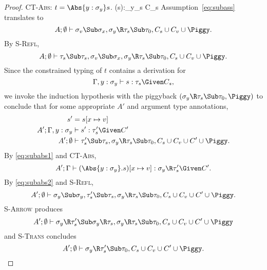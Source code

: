 \documentclass{amsart}
\theoremstyle{definition}
\begin{document}
\begin{proof}
\Case\textsc{CT-Abs}: $t=\Abs{y:\sigma_y}s$.
\def\yasump{\Gamma,y:\sigma_y\vdash s:\tau_s\Given C_s}
\infrule[CT-Abs]
{\yasump}
{\Gamma\vdash(s):\sigma_y\R\tau_s \Given C_s}
Assumption~\eqref{eq:subass} translates to
\[
A;\emptyset\vdash
\sigma_v\Sub\sigma_x,
\sigma_y\R\tau_s\Sub\tau_0,C_s\cup C_v\cup\Piggy.
\]
By \textsc{S-Refl},
\[
A;\emptyset\vdash
    \tau_s\Sub\tau_s,
\sigma_v\Sub\sigma_x,
\sigma_y\R\tau_s\Sub\tau_0,C_s\cup C_v\cup\Piggy.
\]
Since the constrained typing of $t$ contains a derivation for
\[\yasump,\]
we invoke the induction hypothesis with the piggyback
$(\sigma_y\R\tau_s\Sub\tau_0,\Piggy)$ to conclude that for some
appropriate $A'$ and argument type annotations,
\begin{align}
s'&=s[x\mapsto v]\notag
\\
A';\Gamma,y:\sigma_y&\vdash s' : \tau_s'\Given C'
\label{eq:subabs1}
\\
A';\emptyset&\vdash
    \tau_s'\Sub\tau_s,
\sigma_y\R\tau_s\Sub\tau_0,C_s\cup C_v\cup C'\cup\Piggy.
\label{eq:subabs2}
\end{align}
By \eqref{eq:subabs1} and \textsc{CT-Abs},
\[
A';\Gamma\vdash(\Abs{y:\sigma_y}.s)[x\mapsto v] : \sigma_y\R\tau_s'\Given C'.
\]
By \eqref{eq:subabs2} and \textsc{S-Refl},
\[
A';\emptyset\vdash
    \sigma_y\Sub\sigma_y,
    \tau_s'\Sub\tau_s,
\sigma_y\R\tau_s\Sub\tau_0,C_s\cup C_v\cup C'\cup\Piggy.
\]
\textsc{S-Arrow} produces
\[
A';\emptyset\vdash
    \sigma_y\R\tau_s'\Sub\sigma_y\R\tau_s,
\sigma_y\R\tau_s\Sub\tau_0,C_s\cup C_v\cup C'\cup\Piggy
\]
and \textsc{S-Trans} concludes
\[
A';\emptyset\vdash
    \sigma_y\R\tau_s'\Sub\tau_0,
C_s\cup C_v\cup C'\cup\Piggy.
\]


\end{proof}
\end{document}
